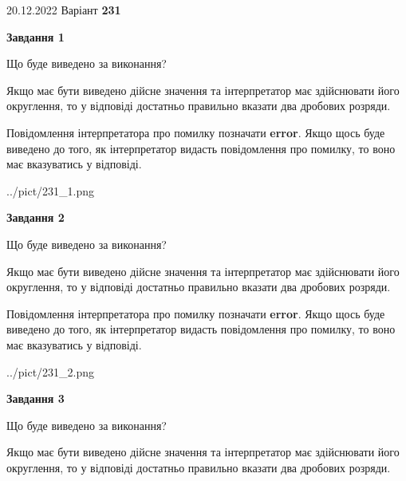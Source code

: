 \documentclass[12pt, ukrainian]{article}
\begin{document}
{20.12.2022 Варіант \No \textbf { 231 }\par}
{
\begin {Large}

{\begin {center}\textbf{Завдання 1}\end {center}}\par
Що буде виведено за виконання? \par

Якщо має бути виведено дійсне значення та інтерпретатор має здійснювати його округлення, 
то у відповіді достатньо правильно вказати два дробових розряди.

Повідомлення інтерпретатора про помилку позначати \textbf{error}.
Якщо щось буде виведено до того, як інтерпретатор видасть повідомлення про помилку, 
то воно має вказуватись у відповіді. \par

\begin{center}
	{../pict/231_1.png}
\end{center}
\newpage

{\begin {center}\textbf{Завдання 2}\end {center}}\par
Що буде виведено за виконання? \par

Якщо має бути виведено дійсне значення та інтерпретатор має здійснювати його округлення, 
то у відповіді достатньо правильно вказати два дробових розряди.

Повідомлення інтерпретатора про помилку позначати \textbf{error}.
Якщо щось буде виведено до того, як інтерпретатор видасть повідомлення про помилку, 
то воно має вказуватись у відповіді. \par

\begin{center}
	{../pict/231_2.png}
\end{center}
\newpage

{\begin {center}\textbf{Завдання 3}\end {center}}\par
Що буде виведено за виконання? \par

Якщо має бути виведено дійсне значення та інтерпретатор має здійснювати його округлення, 
то у відповіді достатньо правильно вказати два дробових розряди.


\end{Large}}
\end{document}
